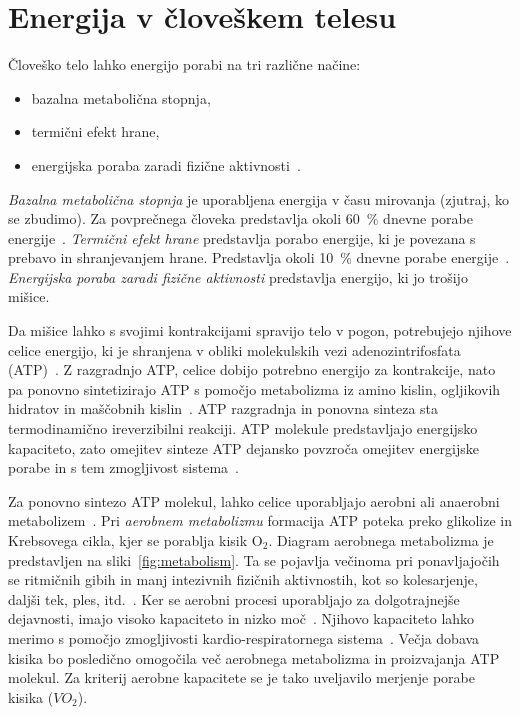 \section{Energija v človeškem telesu}\label{sec:energija}
Človeško telo lahko energijo porabi na tri različne načine:

\begin{itemize}
\item bazalna metabolična stopnja,
\item termični efekt hrane,
\item energijska poraba zaradi fizične aktivnosti~\cite{levine2005measurement}.
\end{itemize}

\emph{Bazalna metabolična stopnja} je uporabljena energija v času mirovanja (zjutraj, ko se zbudimo). Za povprečnega človeka predstavlja okoli \SI{60}{\%} dnevne porabe energije~\cite{levine2005measurement}. \emph{Termični efekt hrane} predstavlja porabo energije, ki je povezana s prebavo in shranjevanjem hrane. Predstavlja okoli \SI{10}{\%} dnevne porabe energije~\cite{levine2005measurement}. \emph{Energijska poraba zaradi fizične aktivnosti} predstavlja energijo, ki jo trošijo mišice. 

Da mišice lahko s svojimi kontrakcijami spravijo telo v pogon, potrebujejo njihove celice energijo, ki je shranjena v obliki molekulskih vezi adenozintrifosfata (ATP)~\cite{scott2005misconceptions}. Z razgradnjo ATP, celice dobijo potrebno energijo za kontrakcije, nato pa ponovno sintetizirajo ATP s pomočjo metabolizma iz amino kislin, ogljikovih hidratov in maščobnih kislin~\cite{scott2005misconceptions,patel2017aerobic}. ATP razgradnja in ponovna sinteza sta termodinamično ireverzibilni reakciji.%
ATP molekule predstavljajo energijsko kapaciteto, zato omejitev sinteze ATP dejansko povzroča omejitev energijske porabe in s tem zmogljivost sistema~\cite{sahlin1998energy}. 

Za ponovno sintezo ATP molekul, lahko celice uporabljajo aerobni ali anaerobni metabolizem~\cite{scott2005misconceptions}. Pri \emph{aerobnem metabolizmu} formacija ATP poteka preko glikolize in Krebsovega cikla, kjer se porablja kisik $\mathrm{O}_2$. Diagram aerobnega metabolizma je predstavljen na sliki~\ref{fig:metabolism}. Ta se pojavlja večinoma pri ponavljajočih se ritmičnih gibih in manj intezivnih fizičnih aktivnostih, kot so kolesarjenje, daljši tek, ples, itd.~\cite{patel2017aerobic}. Ker se aerobni procesi uporabljajo za dolgotrajnejše dejavnosti, imajo visoko kapaciteto in nizko moč~\cite{sahlin1998energy}. Njihovo kapaciteto lahko merimo s pomočjo zmogljivosti kardio-respiratornega sistema~\cite{patel2017aerobic}. Večja dobava kisika bo posledično omogočila več aerobnega metabolizma in proizvajanja ATP molekul. Za kriterij aerobne kapacitete se je tako uveljavilo merjenje porabe kisika (${VO}_2$).

